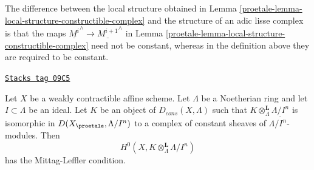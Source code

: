 The difference between the local structure obtained in
Lemma \ref{proetale-lemma-local-structure-constructible-complex}
and the structure of an adic lisse complex is that
the maps $\underline{M^i}^\wedge \to \underline{M^{i + 1}}^\wedge$ in
Lemma \ref{proetale-lemma-local-structure-constructible-complex}
need not be constant, whereas in the definition above they
are required to be constant.

\begin{lemma}
\label{proetale-lemma-weakly-contractible-locally-constant-ML}
\href{https://stacks.math.columbia.edu/tag/09C5}{\texttt{Stacks tag 09C5}}

Let $X$ be a weakly contractible affine scheme. Let $\Lambda$ be a Noetherian
ring and let $I \subset \Lambda$ be an ideal. Let $K$ be an object of
$D_{cons}(X, \Lambda)$ such that
$K \otimes_\Lambda^\mathbf{L} \underline{\Lambda/I^n}$
is isomorphic in $D(X_\proetale, \Lambda/I^n)$ to a
complex of constant sheaves of $\Lambda/I^n$-modules. Then
$$
H^0(X, K \otimes_\Lambda^\mathbf{L} \Lambda/I^n)
$$
has the Mittag-Leffler condition.
\end{lemma}

